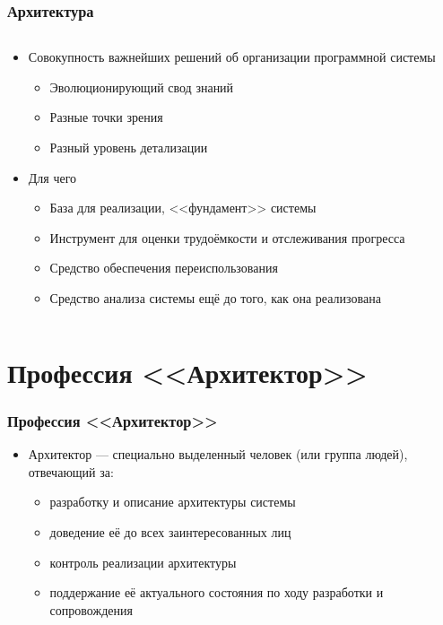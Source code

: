 \documentclass{../cscslides}
\begin{document}
    \begin{frame}
        \frametitle{Архитектура}
        \begin{columns}
            \begin{column}{0.7\textwidth}
                \begin{itemize}
                    \item Совокупность важнейших решений об организации программной системы
                    \begin{itemize}
                        \item Эволюционирующий свод знаний
                        \item Разные точки зрения
                        \item Разный уровень детализации
                    \end{itemize}
                    \item Для чего
                    \begin{itemize}
                        \item База для реализации, <<фундамент>> системы
                        \item Инструмент для оценки трудоёмкости и отслеживания прогресса
                        \item Средство обеспечения переиспользования
                        \item Средство анализа системы ещё до того, как она реализована
                    \end{itemize}
                \end{itemize}
            \end{column}
            \begin{column}{0.3\textwidth}
            \end{column}
        \end{columns}
    \end{frame}

    \section{Профессия <<Архитектор>>}

    \begin{frame}
        \frametitle{Профессия <<Архитектор>>}
        \begin{itemize}
            \item Архитектор --- специально выделенный человек (или группа людей), отвечающий за:
            \begin{itemize}
                \item разработку и описание архитектуры системы
                \item доведение её до всех заинтересованных лиц
                \item контроль реализации архитектуры
                \item поддержание её актуального состояния по ходу разработки и сопровождения
            \end{itemize}
        \end{itemize}
    \end{frame}
\end{document}
